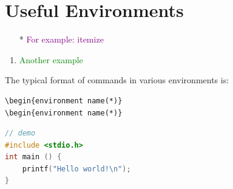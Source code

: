 \documentclass[12pt, letterpaper]{article} %
\begin{document}
\section{Useful Environments} %
\begin{itemize} %
\item[*] \textcolor{purple}{For example: itemize} %
\end{itemize}  %

\begin{abstract}  %
\begin{quote} %
The \LaTeX  $ $ environment is a template with functions, as long as the data is entered in the prescribed format, the 
system will automatically complete the form.
\end{quote} %
\end{abstract} %

\begin{enumerate} %
\item \textcolor{green}{Another example}
\end{enumerate} %

\begin{center} %
The typical format of commands in various environments is: 
\begin{verbatim} 
\begin{environment name(*)}
\begin{environment name(*)}
\end{verbatim} %
\end{center} %

\begin{lstlisting}[language=C++] 
// demo
#include <stdio.h>
int main () {
    printf("Hello world!\n");
}
\end{lstlisting}   %
\end{document}
